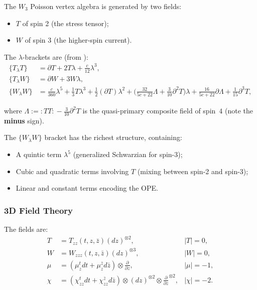 The $W_3$ Poisson vertex algebra is generated by two fields:
\begin{itemize}
\item $T$ of spin 2 (the stress tensor);
\item $W$ of spin 3 (the higher-spin current).
\end{itemize}

The $\lambda$-brackets are (from \cite{KZ25}):
\begin{align}
\{T_\lambda T\} &= \partial T + 2T\lambda + \frac{c}{12}\lambda^3,\\
\{T_\lambda W\} &= \partial W + 3W\lambda,\\
\{W_\lambda W\} &= \frac{c}{360}\lambda^5 + \frac{1}{3}T\lambda^3 + \frac{1}{2}(\partial T)\lambda^2 + \biggl(\frac{32}{5c + 22}\Lambda + \frac{3}{10}\partial^2 T\biggr)\lambda + \frac{16}{5c + 22}\partial\Lambda + \frac{1}{15}\partial^3 T,
\end{align}

\noindent
where $\Lambda := {:\!TT\!:} - \tfrac{3}{10}\partial^2 T$ is the quasi-primary composite field of spin~$4$ (note the \textbf{minus} sign).

\begin{remark}[Structure of $W_3$]
The $\{W_\lambda W\}$ bracket has the richest structure, containing:
\begin{itemize}
\item A quintic term $\lambda^5$ (generalized Schwarzian for spin-3);
\item Cubic and quadratic terms involving $T$ (mixing between spin-2 and spin-3);
\item Linear and constant terms encoding the OPE.
\end{itemize}
\end{remark}

\subsubsection{3D Field Theory}

The fields are:
\begin{align}
T &= T_{zz}(t,z,\bar{z}) (dz)^{\otimes 2}, & |T| = 0,\\
W &= W_{zzz}(t,z,\bar{z}) (dz)^{\otimes 3}, & |W| = 0,\\
\mu &= (\mu^t_z dt + \mu^{\bar{z}}_z d\bar{z}) \otimes \frac{\partial}{\partial z}, & |\mu| = -1,\\
\chi &= (\chi^t_{zz} dt + \chi^{\bar{z}}_{zz} d\bar{z}) \otimes (dz)^{\otimes 2} \otimes \frac{\partial}{\partial z}^{\otimes 2}, & |\chi| = -2.
\end{align}

